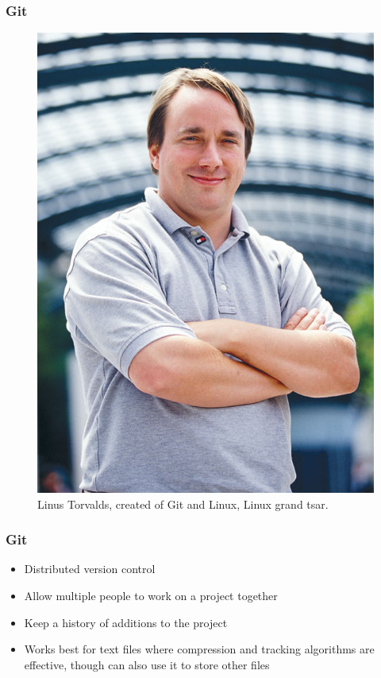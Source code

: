\documentclass{beamer}
\begin{document}
\begin{frame}
\frametitle{Git}
\begin{figure}[t]
\centering
   \includegraphics[scale = 0.3]{Linus_Torvalds.png}
\caption{Linus Torvalds, created of Git and Linux, Linux grand tsar.}
\end{figure}
\end{frame}

\begin{frame}
\frametitle{Git}
\begin{itemize}
\item Distributed version control
\item Allow multiple people to work on a project together
\item Keep a history of additions to the project
\item Works best for text files where compression and tracking algorithms are effective, though can also use it to store other files
\end{itemize}
\end{frame}
\end{document}

